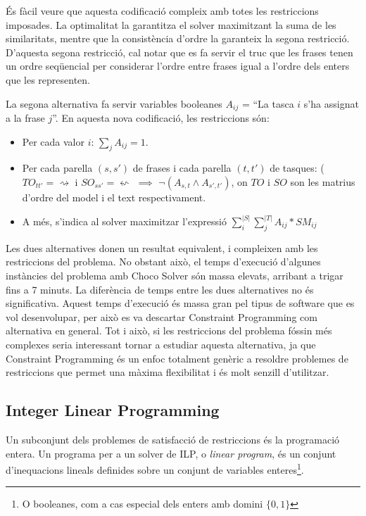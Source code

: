 És fàcil veure que aquesta codificació compleix amb totes les restriccions imposades. La optimalitat la garantitza el solver maximitzant la suma de les similaritats, mentre que la consistència d'ordre la garanteix la segona restricció. D'aquesta segona restricció, cal notar que es fa servir el truc que les frases tenen un ordre seqüencial per considerar l'ordre entre frases igual a l'ordre dels enters que les representen.

La segona alternativa fa servir variables booleanes $A_{ij}$ = ``La tasca $i$ s'ha assignat a la frase $j$''. En aquesta nova codificació, les restriccions són:

\begin{itemize}
    \item Per cada valor $i$: $\sum_j{A_{ij}} = 1$.
    \item Per cada parella $(s, s')$ de frases i cada parella $(t, t')$ de tasques: ($TO_{tt'} = \rightsquigarrow$ i $SO_{ss'} = \leftsquigarrow$ $\implies$ $\lnot (A_{s,t} \land A_{s',t'})$, on $TO$ i $SO$ son les matrius d'ordre del model i el text respectivament.
    \item A més, s'indica al solver maximitzar l'expressió $\sum_i^{|S|}{\sum_j^{|T|}{A_{ij} * SM_{ij}}}$
\end{itemize}

Les dues alternatives donen un resultat equivalent, i compleixen amb les restriccions del problema. No obstant això, el temps d'execució d'algunes instàncies del problema amb Choco Solver són massa elevats, arribant a trigar fins a 7 minuts. La diferència de temps entre les dues alternatives no és significativa. Aquest temps d'execució és massa gran pel tipus de software que es vol desenvolupar, per això es va descartar Constraint Programming com alternativa en general. Tot i això, si les restriccions del problema fóssin més complexes seria interessant tornar a estudiar aquesta alternativa, ja que Constraint Programming és un enfoc totalment genèric a resoldre problemes de restriccions que permet una màxima flexibilitat i és molt senzill d'utilitzar.

\subsection{Integer Linear Programming}
\label{sec:implementacio-ilp}

Un subconjunt dels problemes de satisfacció de restriccions és la programació entera. Un programa per a un solver de ILP\cite{ILP}, o \emph{linear program}, és un conjunt d'inequacions lineals definides sobre un conjunt de variables enteres\footnote{O booleanes, com a cas especial dels enters amb domini $\{0,1\}$}.

